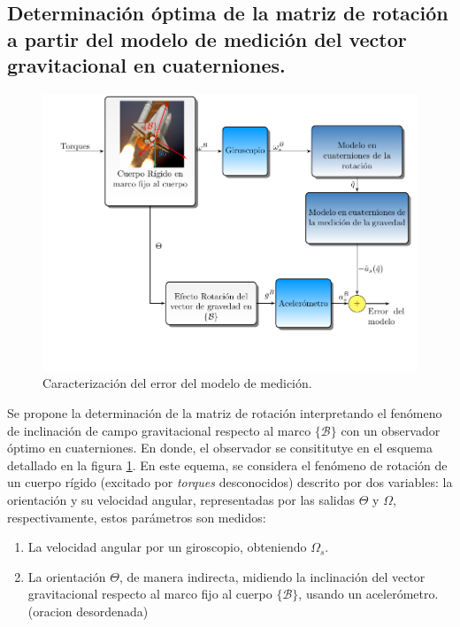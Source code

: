 \documentclass[conference]{IEEEtran}
\newcommand{\marco}[1]{\{\mathcal{#1}\}}
\begin{document}
\subsection{Determinación óptima de la matriz de rotación a partir del modelo de medición del vector gravitacional en cuaterniones.}
\begin{figure} [t]
\begin{center}
\includegraphics[scale=0.50,viewport=20 50 430 330,clip]{ObsOptimo_fig3.pdf}
\caption{Caracterización del error del modelo de medición.}
\label{ObsOptimo_fig2}
\end{center}
\end{figure}
Se propone la determinación de la matriz de rotación interpretando el fenómeno de inclinación de campo gravitacional respecto al marco $\marco{B}$ con un observador óptimo en cuaterniones. En donde, el observador se consititutye en el esquema detallado en la figura \ref{ObsOptimo_fig2}. En este equema, se considera el fenómeno de rotación de un cuerpo rígido (excitado por \emph{torques} desconocidos) descrito por dos variables: la orientación y su velocidad angular, representadas por las salidas $\Theta$ y $\Omega$, respectivamente, estos parámetros son medidos:
\begin{enumerate} 
\item La velocidad angular por un giroscopio, obteniendo $\Omega_s$.
\item La orientación $\Theta$, de manera indirecta, midiendo la inclinación del vector gravitacional respecto al marco fijo al cuerpo $\marco{B}$, usando un acelerómetro.(oracion desordenada)
\end{enumerate}
\end{document}
